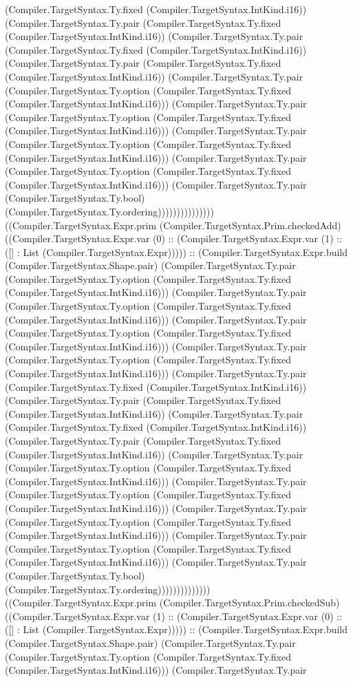 \documentclass[11pt]{article}
\begin{document}
(Compiler.TargetSyntax.Ty.fixed (Compiler.TargetSyntax.IntKind.i16)) (Compiler.TargetSyntax.Ty.pair (Compiler.TargetSyntax.Ty.fixed (Compiler.TargetSyntax.IntKind.i16)) (Compiler.TargetSyntax.Ty.pair (Compiler.TargetSyntax.Ty.fixed (Compiler.TargetSyntax.IntKind.i16)) (Compiler.TargetSyntax.Ty.pair (Compiler.TargetSyntax.Ty.fixed (Compiler.TargetSyntax.IntKind.i16)) (Compiler.TargetSyntax.Ty.pair (Compiler.TargetSyntax.Ty.option (Compiler.TargetSyntax.Ty.fixed (Compiler.TargetSyntax.IntKind.i16))) (Compiler.TargetSyntax.Ty.pair (Compiler.TargetSyntax.Ty.option (Compiler.TargetSyntax.Ty.fixed (Compiler.TargetSyntax.IntKind.i16))) (Compiler.TargetSyntax.Ty.pair (Compiler.TargetSyntax.Ty.option (Compiler.TargetSyntax.Ty.fixed (Compiler.TargetSyntax.IntKind.i16))) (Compiler.TargetSyntax.Ty.pair (Compiler.TargetSyntax.Ty.option (Compiler.TargetSyntax.Ty.fixed (Compiler.TargetSyntax.IntKind.i16))) (Compiler.TargetSyntax.Ty.pair (Compiler.TargetSyntax.Ty.bool) (Compiler.TargetSyntax.Ty.ordering))))))))))))))) ((Compiler.TargetSyntax.Expr.prim (Compiler.TargetSyntax.Prim.checkedAdd) ((Compiler.TargetSyntax.Expr.var (0) :: (Compiler.TargetSyntax.Expr.var (1) :: ([] : List (Compiler.TargetSyntax.Expr))))) :: (Compiler.TargetSyntax.Expr.build (Compiler.TargetSyntax.Shape.pair) (Compiler.TargetSyntax.Ty.pair (Compiler.TargetSyntax.Ty.option (Compiler.TargetSyntax.Ty.fixed (Compiler.TargetSyntax.IntKind.i16))) (Compiler.TargetSyntax.Ty.pair (Compiler.TargetSyntax.Ty.option (Compiler.TargetSyntax.Ty.fixed (Compiler.TargetSyntax.IntKind.i16))) (Compiler.TargetSyntax.Ty.pair (Compiler.TargetSyntax.Ty.option (Compiler.TargetSyntax.Ty.fixed (Compiler.TargetSyntax.IntKind.i16))) (Compiler.TargetSyntax.Ty.pair (Compiler.TargetSyntax.Ty.option (Compiler.TargetSyntax.Ty.fixed (Compiler.TargetSyntax.IntKind.i16))) (Compiler.TargetSyntax.Ty.pair (Compiler.TargetSyntax.Ty.fixed (Compiler.TargetSyntax.IntKind.i16)) (Compiler.TargetSyntax.Ty.pair (Compiler.TargetSyntax.Ty.fixed (Compiler.TargetSyntax.IntKind.i16)) (Compiler.TargetSyntax.Ty.pair (Compiler.TargetSyntax.Ty.fixed (Compiler.TargetSyntax.IntKind.i16)) (Compiler.TargetSyntax.Ty.pair (Compiler.TargetSyntax.Ty.fixed (Compiler.TargetSyntax.IntKind.i16)) (Compiler.TargetSyntax.Ty.pair (Compiler.TargetSyntax.Ty.option (Compiler.TargetSyntax.Ty.fixed (Compiler.TargetSyntax.IntKind.i16))) (Compiler.TargetSyntax.Ty.pair (Compiler.TargetSyntax.Ty.option (Compiler.TargetSyntax.Ty.fixed (Compiler.TargetSyntax.IntKind.i16))) (Compiler.TargetSyntax.Ty.pair (Compiler.TargetSyntax.Ty.option (Compiler.TargetSyntax.Ty.fixed (Compiler.TargetSyntax.IntKind.i16))) (Compiler.TargetSyntax.Ty.pair (Compiler.TargetSyntax.Ty.option (Compiler.TargetSyntax.Ty.fixed (Compiler.TargetSyntax.IntKind.i16))) (Compiler.TargetSyntax.Ty.pair (Compiler.TargetSyntax.Ty.bool) (Compiler.TargetSyntax.Ty.ordering)))))))))))))) ((Compiler.TargetSyntax.Expr.prim (Compiler.TargetSyntax.Prim.checkedSub) ((Compiler.TargetSyntax.Expr.var (1) :: (Compiler.TargetSyntax.Expr.var (0) :: ([] : List (Compiler.TargetSyntax.Expr))))) :: (Compiler.TargetSyntax.Expr.build (Compiler.TargetSyntax.Shape.pair) (Compiler.TargetSyntax.Ty.pair (Compiler.TargetSyntax.Ty.option (Compiler.TargetSyntax.Ty.fixed (Compiler.TargetSyntax.IntKind.i16))) (Compiler.TargetSyntax.Ty.pair 
\end{document}

